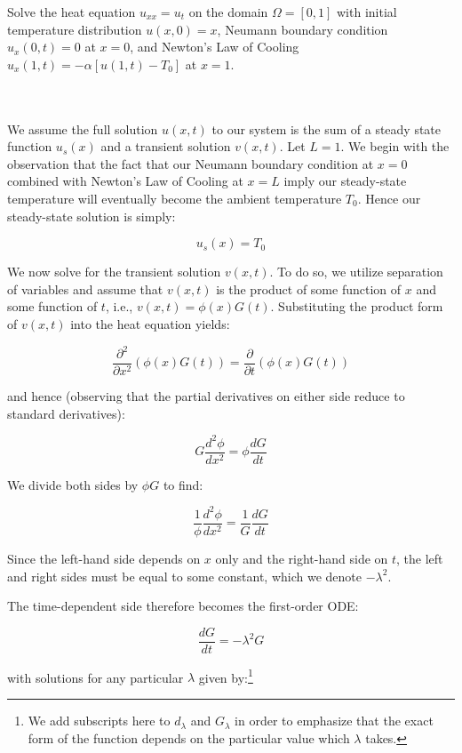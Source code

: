 Solve the heat equation $u_{xx} = u_t$ on the domain $\Omega = [0, 1]$ with initial temperature distribution 
$u(x, 0) = x$, Neumann boundary condition $u_x(0, t) = 0$ at $x = 0$, and Newton's Law of Cooling 
$u_x(1, t) = -\alpha\left[ u(1, t) - T_0 \right]$ at $x = 1$.

\begin{solution}\ \\\\
    We assume the full solution $u(x, t)$ to our system is the sum of a steady state function $u_s(x)$ and a transient 
    solution $v(x, t)$. Let $L = 1$. We begin with the observation that the fact that our Neumann boundary condition 
    at $x = 0$ combined with Newton's Law of Cooling at $x = L$ imply our steady-state temperature will eventually become
    the ambient temperature $T_0$. Hence our steady-state solution is simply:

    $$
        u_s(x) = T_0
    $$

    We now solve for the transient solution $v(x, t)$.  To do so, we utilize separation 
    of variables and assume that $v(x, t)$ is the product of some function of $x$ and some function of $t$, i.e., 
    $v(x, t) = \phi(x) G(t)$. Substituting the product form of $v(x, t)$ into the heat equation yields:

    $$
        \frac{\partial^2}{\partial x^2} (\phi(x) G(t)) = \frac{\partial}{\partial t} (\phi(x) G(t))
    $$

    and hence (observing that the partial derivatives on either side reduce to standard derivatives):

    $$
        G \frac{d^2 \phi}{d x^2} = \phi \frac{d G}{d t}
    $$

    We divide both sides by $\phi G$ to find:

    $$
        \frac{1}{\phi} \frac{d^2 \phi}{d x^2} = \frac{1}{G} \frac{d G}{d t}
    $$

    Since the left-hand side depends on $x$ only and the right-hand side on $t$, the left and right sides must be equal
    to some constant, which we denote $-\lambda^2$.

    The time-dependent side therefore becomes the first-order ODE:

    $$
        \frac{d G}{d t} = -\lambda^2 G
    $$

    with solutions for any particular $\lambda$ given by:\footnote{
        We add subscripts here to $d_{\lambda}$ and $G_{\lambda}$ in order to emphasize that the exact form of the 
        function depends on the particular value which $\lambda$ takes.
    }


\end{solution}
